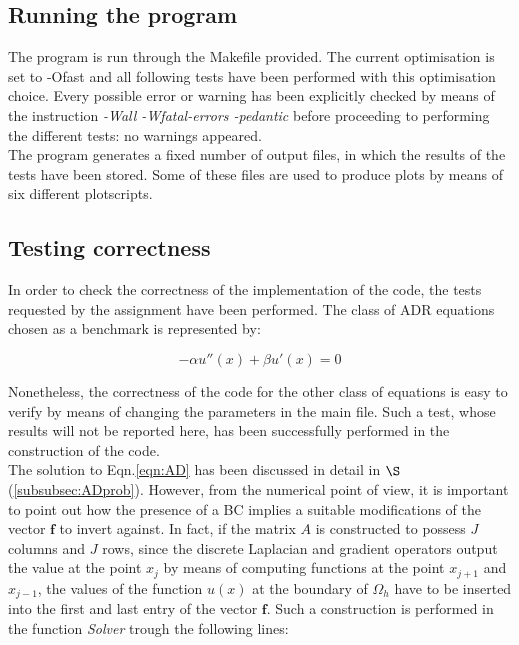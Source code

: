 \documentclass[11pt]{article}
\theoremstyle{theorem}
\theoremstyle{definition}
\begin{document}
\subsection{Running the program}
The program is run through the Makefile provided. The current optimisation is set to -Ofast and all following tests have been performed with this optimisation choice. Every possible error or warning has been explicitly checked by means of the instruction \emph{-Wall -Wfatal-errors -pedantic} before proceeding to performing the different tests: no warnings appeared.\\
The program generates a fixed number of output files, in which the results of the tests have been stored. Some of these files are used to produce plots by means of six different plotscripts.\\ 

\subsection{Testing correctness}
In order to check the correctness of the implementation of the code, the tests requested by the assignment have been performed. The class of ADR equations chosen as a benchmark is represented by:

\begin{equation}
	\label{eqn:AD}
	-\alpha u''(x)+\beta u'(x) = 0
\end{equation}

Nonetheless, the correctness of the code for the other class of equations is easy to verify by means of changing the parameters in the main file. Such a test, whose results will not be reported here, has been successfully performed in the construction of the code.\\
The solution to Eqn.\eqref{eqn:AD} has been discussed in detail in $\S$(\ref{subsubsec:ADprob}). However, from the numerical point of view, it is important to point out how the presence of a BC implies a suitable modifications of the vector $\mathbf{f}$ to invert against. In fact, if the matrix $A$ is constructed to possess $J$ columns and $J$ rows, since the discrete Laplacian and gradient operators output the value at the point $x_j$ by means of computing functions at the point $x_{j+1}$ and $x_{j-1}$, the values of the function $u(x)$ at the boundary of $\Omega_h$ have to be inserted into the first and last entry of the vector $\mathbf{f}$. Such a construction is performed in the function \emph{Solver} trough the following lines:
\end{document}
